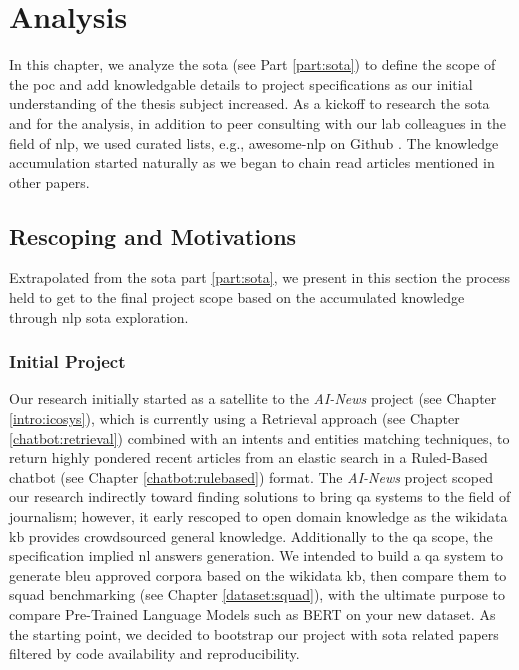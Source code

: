 \chapter{Analysis}
\label{chap:analysis}

In this chapter, we analyze the \gls{sota} (see Part \ref{part:sota}) to define the scope of the \gls{poc} and add knowledgable details to project specifications as our initial understanding of the thesis subject increased. As a kickoff to research the \gls{sota} and for the analysis, in addition to peer consulting with our lab colleagues in the field of \gls{nlp}, we used curated lists, e.g., awesome-nlp on Github \autocite{website:awesomenlp-github}. The knowledge accumulation started naturally as we began to chain read articles mentioned in other papers.

\section{Rescoping and Motivations}
\label{analysis:rescoping}
Extrapolated from the \gls{sota} part \ref{part:sota}, we present in this section the process held to get to the final project scope based on the accumulated knowledge through \gls{nlp} \gls{sota} exploration.

\subsection{Initial Project}
Our research initially started as a satellite to the \textit{AI-News} project (see Chapter \ref{intro:icosys}), which is currently using a Retrieval approach (see Chapter \ref{chatbot:retrieval}) combined with an intents and entities matching techniques, to return highly pondered recent articles from an elastic search in a Ruled-Based chatbot (see Chapter \ref{chatbot:rulebased}) format. The \textit{AI-News} project scoped our research indirectly toward finding solutions to bring \gls{qa} systems to the field of journalism; however, it early rescoped to open domain knowledge as the \gls{wikidata} \gls{kb} provides crowdsourced general knowledge. Additionally to the \gls{qa} scope, the specification implied \gls{nl} answers generation. We intended to build a \gls{qa} system to generate \gls{bleu} approved corpora based on the \gls{wikidata} \gls{kb}, then compare them to \gls{squad} benchmarking (see Chapter \ref{dataset:squad}), with the ultimate purpose to compare Pre-Trained Language Models such as BERT on your new dataset. As the starting point, we decided to bootstrap our project with \gls{sota} related papers filtered by code availability and reproducibility.

